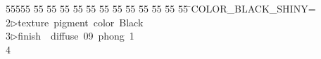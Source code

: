 %
%
\begin{tabbing}
55555 \= 55 \= 55 \= 55 \= 55 \= 55 \= 55 \= 55 \= 55 \= 55 \= 55 \= 55 \= 55 \= \>COLOR\_BLACK\_SHINY=\\[0pt]
2\>$\triangleright$\>texture\ pigment\ color\ Black\ \ \\[0pt]
3\>$\triangleright$\>finish\ \ diffuse\ 09\ phong\ 1\\[0pt]
4\>\end{tabbing}
